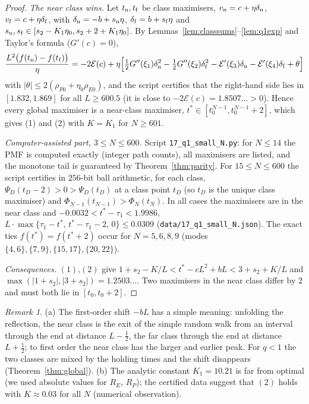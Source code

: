 \documentclass[11pt,a4paper]{article}
\theoremstyle{definition}
\theoremstyle{remark}
\newtheorem{remark}[theorem]{Remark}
\begin{document}
\begin{proof}
\emph{The near class wins.} Let $t_{\rm n},t_{\rm f}$ be class maximisers, $v_{\rm n}=c+\eta\delta_{\rm n}$,
$v_{\rm f}=c+\eta\delta_{\rm f}$, with $\delta_{\rm n}=-b+s_{\rm n}\eta$, $\delta_{\rm f}=b+s_{\rm f}\eta$ and
$s_{\rm n},s_{\rm f}\in[s_2-K_1\eta_0,s_2+2+K_1\eta_0]$. By Lemmas~\ref{lem:classsums}--\ref{lem:q1exp} and Taylor's
formula ($G'(c)=0$),
\[
  \frac{L^2\bigl(f(t_{\rm n})-f(t_{\rm f})\bigr)}{\eta}
  =-2\mathcal E(c)+\eta\Bigl[\tfrac12G''(\xi_1)\delta_{\rm n}^2-\tfrac12G''(\xi_2)\delta_{\rm f}^2
   -\mathcal E'(\xi_3)\delta_{\rm n}-\mathcal E'(\xi_4)\delta_{\rm f}+\theta\Bigr]
\]
with $|\theta|\le2(\rho_{P0}+\eta_0\rho_{E0})$,
and the script certifies that the right-hand side lies in $[1.832,1.869]$ for all $L\ge600.5$ (it is close to
$-2\mathcal E(c)=1.8507\ldots>0$). Hence every global maximiser is a near-class maximiser, $t^*\in[t_0^{N-1},t_0^{N-1}+2]$, which
gives (1) and (2) with $K=K_1$ for $N\ge601$.

\emph{Computer-assisted part, $3\le N\le600$.} Script \texttt{17\_q1\_small\_N.py}: for $N\le14$ the PMF is computed
exactly (integer path counts), all maximisers are listed, and the monotone tail is guaranteed by
Theorem~\ref{thm:parity}. For $15\le N\le600$ the script certifies in $256$-bit ball arithmetic, for each class,
$\Psi_D(t_D-2)>0>\Psi_D(t_D)$ at a class point $t_D$ (so $t_D$ is the unique class maximiser) and
$\Phi_{N-1}(t_{N-1})>\Phi_N(t_N)$. In all cases the maximisers are in the near class and
$-0.0032<t^*-\tau_1<1.9986$, $L\cdot\max\{\tau_1-t^*,\,t^*-\tau_1-2,\,0\}\le0.0309$
(\texttt{data/17\_q1\_small\_N.json}). The exact ties $f(t^*)=f(t^*+2)$ occur for $N=5,6,8,9$
(modes $\{4,6\},\{7,9\},\{15,17\},\{20,22\}$).

\emph{Consequences.} $(1)$,$(2)$ give $1+s_2-K/L<t^*-cL^2+bL<3+s_2+K/L$ and $\max(|1+s_2|,|3+s_2|)=1.2503\ldots$.
Two maximisers in the near class differ by $2$ and must both lie in $[t_0,t_0+2]$.
\end{proof}

\begin{remark}
(a) The first-order shift $-bL$ has a simple meaning: unfolding the reflection, the near class is the exit of the
simple random walk from an interval through the end at distance $L-\frac12$, the far class through the end at
distance $L+\frac12$; to first order the near class has the larger and earlier peak. For $q<1$ the two classes are
mixed by the holding times and the shift disappears (Theorem~\ref{thm:global}). (b) The analytic constant $K_1=10.21$
is far from optimal (we used absolute values for $R_E$, $R_P$); the certified data suggest that $(2)$ holds with
$K\approx0.03$ for all $N$ (numerical observation).
\end{remark}
\end{document}

